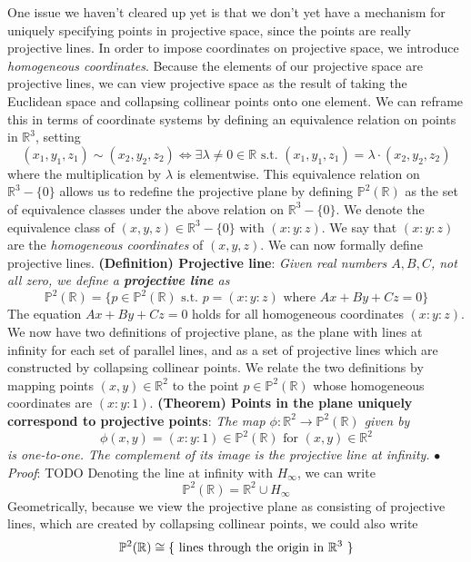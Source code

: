 \documentclass{article}
\newcommand*{\tb}{\textbf}
\newcommand*{\ti}{\textit}
\newcommand*{\n}{\newline}
\newcommand*{\nn}{\newline \newline}
\newcommand*{\Pf}{\indent \ensuremath{\bullet} \textit{Proof}: }
\begin{document}
\n
One issue we haven't cleared up yet is that we don't yet have a mechanism for uniquely specifying points in projective space, since the points are really projective lines. In order to impose coordinates on projective space, we introduce \ti{homogeneous coordinates}. Because the elements of our projective space are projective lines, we can view projective space as the result of taking the Euclidean space and collapsing collinear points onto one element. We can reframe this in terms of coordinate systems by defining an equivalence relation on points in $ \mathbb{R}^3 $, setting
$$ (x_1, y_1, z_1) \sim (x_2, y_2, z_2) \iff \exists \lambda \neq 0 \in \mathbb{R} \text{ s.t. } (x_1, y_1, z_1) = \lambda \cdot (x_2, y_2, z_2) $$
where the multiplication by $ \lambda $ is elementwise. This equivalence relation on $ \mathbb{R}^3 - \{ 0 \} $ allows us to redefine the projective plane by defining $ \mathbb{P}^2(\mathbb{R}) $ as the set of equivalence classes under the above relation on $ \mathbb{R}^3 - \{ 0 \} $. We denote the equivalence class of $ (x, y, z) \in \mathbb{R}^3 - \{ 0 \} $ with $ (x : y : z) $. We say that $ (x : y : z) $ are the \ti{homogeneous coordinates} of $ (x, y, z) $. We can now formally define projective lines.
\nn
\tb{(Definition) Projective line}: \ti{Given real numbers $ A, B, C $, not all zero, we define a \tb{projective line} as}
$$ \mathbb{P}^2(\mathbb{R}) = \{ p \in \mathbb{P}^2(\mathbb{R}) \text{ s.t. } p = (x : y : z) \text{ where } A x + B y + C z = 0 \} $$
The equation $ A x + B y + C z = 0 $ holds for all homogeneous coordinates $ (x : y : z) $. We now have two definitions of projective plane, as the plane with lines at infinity for each set of parallel lines, and as a set of projective lines which are constructed by collapsing collinear points. We relate the two definitions by mapping points $ (x, y) \in \mathbb{R}^2 $ to the point $ p \in \mathbb{P}^2(\mathbb{R}) $ whose homogeneous coordinates are $ (x : y : 1) $.
\nn
\tb{(Theorem) Points in the plane uniquely correspond to projective points}: \ti{The map $ \phi: \mathbb{R}^2 \rightarrow \mathbb{P}^2(\mathbb{R}) $ given by}
$$ \phi(x, y) = (x : y : 1) \in \mathbb{P}^2(\mathbb{R}) \text{ for } (x, y) \in \mathbb{R}^2 $$
\indent \ti{is one-to-one. The complement of its image is the projective line at infinity.}
\n
\Pf TODO
\nn
Denoting the line at infinity with $ H_\infty $, we can write
$$ \mathbb{P}^2(\mathbb{R}) = \mathbb{R}^2 \cup H_\infty $$
Geometrically, because we view the projective plane as consisting of projective lines, which are created by collapsing collinear points, we could also write
$$ \mathbb{P}^2(\mathbb{R}) \cong \{ \text{ lines through the origin in $ \mathbb{R}^3 $ } \} $$
\end{document}
